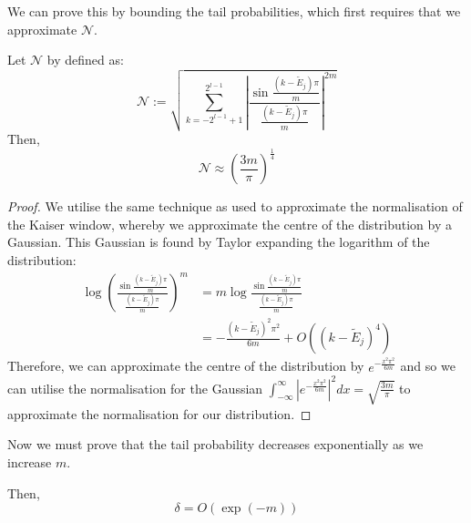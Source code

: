 We can prove this by bounding the tail probabilities, which first requires that we approximate $\mathcal{N}$.
\begin{lemma}
    Let $\mathcal{N}$ by defined as:
    \begin{equation}
       \mathcal{N} := \sqrt{\sum_{k=-2^{l-1}+1}^{2^{l-1}} \left|\frac{\sin \frac{(k-\tilde E_j)\pi}{m}}{ \frac{(k-\tilde E_j)\pi}{m}}\right|^{2m}}
    \end{equation} 
    Then, 
    \begin{equation}
        \mathcal{N} \approx \left(\frac{3m}{\pi}\right)^{\frac{1}{4}}
    \end{equation}
    \label{lemma:bspline_norm}
\end{lemma}
\begin{proof}
    We utilise the same technique as \cite{Berry:2022ccu} used to approximate the normalisation of the Kaiser window, whereby we approximate the centre of the distribution by a Gaussian. This Gaussian is found by Taylor expanding the logarithm of the distribution:
    \begin{align}
                \log \left(\frac{\sin \frac{(k-\tilde E_j)\pi}{m}}{ \frac{(k-\tilde E_j)\pi}{m}}\right)^m &= m \log \frac{\sin \frac{(k-\tilde E_j)\pi}{m}}{ \frac{(k-\tilde E_j)\pi}{m}}\\
                &= - \frac{(k-\tilde E_j)^2 \pi^2}{6m} + O\left((k-\tilde E_j)^4\right)
    \end{align}
    Therefore, we can approximate the centre of the distribution by $e^{ - \frac{x^2 \pi^2}{6m}}$ and so we can utilise the normalisation for the Gaussian $\int_{-\infty}^{\infty}\left|e^{ - \frac{x^2 \pi^2}{6m}}\right|^2 dx = \sqrt{\frac{3m}{\pi}}$ to approximate the normalisation for our distribution.

\end{proof}
Now we must prove that the tail probability decreases exponentially as we increase $m$.
\begin{lemma}
     Then,
    \begin{equation}
        \delta = O\left(\exp (-m)\right)
    \end{equation}
    \label{lemma:bspline_prob}
\end{lemma}
